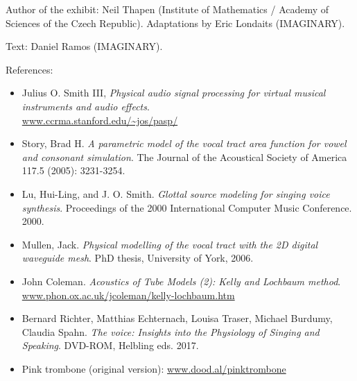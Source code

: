 \begin{sectcredits}

\item[Author of the exhibit:] Neil Thapen (Institute of Mathematics / Academy of Sciences of the Czech Republic). Adaptations by Eric Londaits (IMAGINARY). 

\item[Text:] Daniel Ramos (IMAGINARY).

\item[References:] \strut 

\noindent \begin{itemize}[leftmargin=*]
\item Julius O. Smith III, \emph{Physical audio signal processing for virtual musical instruments and audio effects}. \\\url{www.ccrma.stanford.edu/~jos/pasp/}

\item Story, Brad H. \emph{A parametric model of the vocal tract area function for vowel and consonant simulation}. The Journal of the Acoustical Society of America 117.5 (2005): 3231-3254.

\item Lu, Hui-Ling, and J. O. Smith. \emph{Glottal source modeling for singing voice synthesis}. Proceedings of the 2000 International Computer Music Conference. 2000.

\item Mullen, Jack. \emph{Physical modelling of the vocal tract with the 2D digital waveguide mesh}. PhD thesis, University of York, 2006.

\item John Coleman. \emph{Acoustics of Tube Models (2): Kelly and Lochbaum method}. \\
\url{www.phon.ox.ac.uk/jcoleman/kelly-lochbaum.htm}

\item Bernard Richter, Matthias Echternach, Louisa Traser, Michael Burdumy, Claudia Spahn. \emph{The voice: Insights into the Physiology of Singing and Speaking}. DVD-ROM, Helbling eds. 2017.

\item Pink trombone (original version): \url{www.dood.al/pinktrombone}
\end{itemize}

\end{sectcredits}

